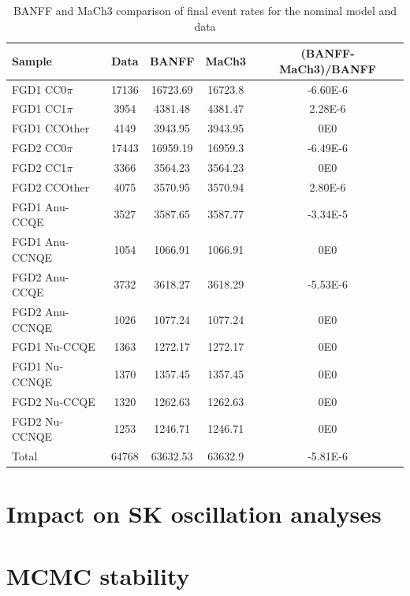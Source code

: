 \begin{table}[!h]
  \begin{tabular}{ l | c c c | c }
    \hline \hline 
                Sample & Data  & BANFF & MaCh3 & (BANFF-MaCh3)/BANFF \\ 
                \hline
                FGD1 CC0$\pi$ &  17136 &  16723.69 & 16723.8 & -6.60E-6 \\
                FGD1 CC1$\pi$ &  3954 &  4381.48 & 4381.47 & 2.28E-6\\ 
                FGD1 CCOther &  4149 &  3943.95 & 3943.95 & 0E0\\ 
                \hline
                FGD2 CC0$\pi$ &  17443 &  16959.19 & 16959.3 & -6.49E-6 \\
                FGD2 CC1$\pi$ &  3366 &  3564.23 & 3564.23 & 0E0\\
                FGD2 CCOther &  4075 &  3570.95 & 3570.94 & 2.80E-6 \\
                \hline
                FGD1 Anu-CCQE &  3527 &  3587.65 & 3587.77 & -3.34E-5\\ 
                FGD1 Anu-CCNQE &  1054 &  1066.91 & 1066.91 & 0E0\\
                \hline
                FGD2 Anu-CCQE &  3732 &  3618.27 & 3618.29 & -5.53E-6 \\
                FGD2 Anu-CCNQE &  1026 &  1077.24 & 1077.24 & 0E0 \\
                \hline
                FGD1 Nu-CCQE &  1363 &  1272.17 & 1272.17 & 0E0\\
                FGD1 Nu-CCNQE &  1370 &  1357.45 & 1357.45 & 0E0 \\
                \hline
                FGD2 Nu-CCQE &  1320 &  1262.63 & 1262.63 & 0E0 \\
                FGD2 Nu-CCNQE &  1253 &  1246.71 & 1246.71 & 0E0 \\
                \hline
                Total &  64768 &  63632.53 & 63632.9 & -5.81E-6 \\
                \hline
                \hline
  \end{tabular}
        \caption{BANFF and MaCh3 comparison of final event rates for the nominal model and data}
        \label{tab:eventrate_banff_mach3}
\end{table}
\section{Impact on SK oscillation analyses}

\section{MCMC stability}

